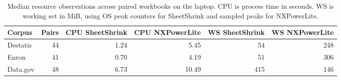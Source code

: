 \begin{table}[t]
\caption{Median resource observations across paired workbooks on the laptop.
CPU is process time in seconds.
WS is working set in MiB, using OS peak counters for SheetShrink and sampled peaks for NXPowerLite.}
\label{tab:top49-resources}
\centering
\setlength{\tabcolsep}{3pt}
\begin{tabular}{lrrrrr}
\hline
Corpus & Pairs & CPU SheetShrink & CPU NXPowerLite & WS SheetShrink & WS NXPowerLite \\
\hline
Destatis & 44 & 1.24 & 5.45 & 54 & 248 \\
Enron & 41 & 0.70 & 4.19 & 51 & 306 \\
Data.gov & 48 & 6.73 & 10.49 & 415 & 146 \\
\hline
\end{tabular}
\end{table}
